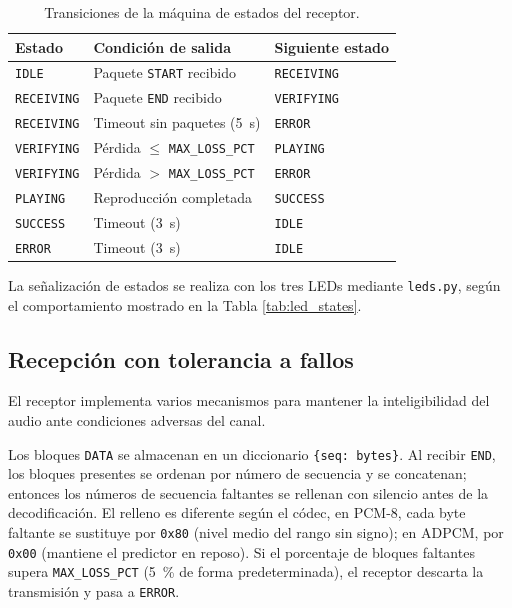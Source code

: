 \begin{table}[htb]
    \centering
    \caption{Transiciones de la máquina de estados del receptor.}
    \label{tab:fsm_rx}
    \begin{tabular}{@{}lll@{}}
        \toprule
        Estado & Condición de salida & Siguiente estado \\
        \midrule
        \texttt{IDLE}       & Paquete \texttt{START} recibido        & \texttt{RECEIVING}  \\
        \texttt{RECEIVING}  & Paquete \texttt{END} recibido          & \texttt{VERIFYING}  \\
        \texttt{RECEIVING}  & Timeout sin paquetes (\SI{5}{\second}) & \texttt{ERROR}      \\
        \texttt{VERIFYING}  & Pérdida $\leq$ \texttt{MAX\_LOSS\_PCT} & \texttt{PLAYING}    \\
        \texttt{VERIFYING}  & Pérdida $>$ \texttt{MAX\_LOSS\_PCT}    & \texttt{ERROR}      \\
        \texttt{PLAYING}    & Reproducción completada                & \texttt{SUCCESS}    \\
        \texttt{SUCCESS}    & Timeout (\SI{3}{\second})              & \texttt{IDLE}       \\
        \texttt{ERROR}      & Timeout (\SI{3}{\second})              & \texttt{IDLE}       \\
        \bottomrule
    \end{tabular}
\end{table}

La señalización de estados se realiza con los tres LEDs mediante \texttt{leds.py}, según el comportamiento mostrado en la Tabla \ref{tab:led_states}.

\subsection{Recepción con tolerancia a fallos}

El receptor implementa varios mecanismos para mantener la inteligibilidad del audio ante condiciones adversas del canal.

Los bloques \texttt{DATA} se almacenan en un diccionario \texttt{\{seq: bytes\}}.
Al recibir \texttt{END}, los bloques presentes se ordenan por número de secuencia y se concatenan; entonces los números de secuencia faltantes se rellenan con silencio antes de la decodificación.
El relleno es diferente según el códec, en PCM-8, cada byte faltante se sustituye por \texttt{0x80} (nivel medio del rango sin signo); en ADPCM, por \texttt{0x00} (mantiene el predictor en reposo).
Si el porcentaje de bloques faltantes supera \texttt{MAX\_LOSS\_PCT} (\SI{5}{\percent} de forma predeterminada), el receptor descarta la transmisión y pasa a \texttt{ERROR}.

